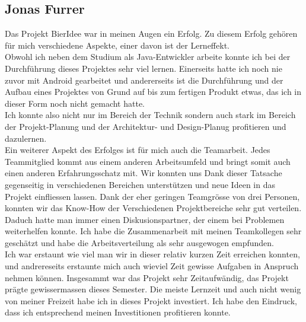 \documentclass[10pt,a4paper]{scrartcl}
\begin{document}
\subsection{Jonas Furrer}
Das Projekt BierIdee war in meinen Augen ein Erfolg. Zu diesem Erfolg gehören für mich verschiedene Aspekte, einer davon 
ist der Lerneffekt.\\
Obwohl ich neben dem Studium als Java-Entwickler arbeite konnte ich bei der Durchführung dieses Projektes sehr viel 
lernen. Einerseits hatte ich noch nie zuvor mit Android gearbeitet und andererseits ist die Durchführung und der Aufbau
eines Projektes von Grund auf bis zum fertigen Produkt etwas, das ich in dieser Form noch nicht gemacht hatte.\\
Ich konnte also nicht nur im Bereich der Technik sondern auch stark im Bereich der Projekt-Planung und der 
Architektur- und Design-Planug profitieren und dazulernen.\\
Ein weiterer Aspekt des Erfolges ist für mich auch die Teamarbeit. Jedes Teammitglied kommt aus einem anderen 
Arbeitsumfeld und bringt somit auch einen anderen Erfahrungsschatz mit. Wir konnten uns Dank dieser Tatsache gegenseitig
in verschiedenen Bereichen unterstützen und neue Ideen in das Projekt einfliessen lassen. Dank der eher geringen
Teamgrösse von drei Personen, konnten wir das Know-How der Verschiedenen Projektbereiche sehr gut verteilen. Daduch
hatte man immer einen Diskusionspartner, der einem bei Problemen weiterhelfen konnte. Ich habe die Zusammenarbeit mit 
meinen Teamkollegen sehr geschätzt und habe die Arbeitsverteilung als sehr ausgewogen empfunden.\\
Ich war erstaunt wie viel man wir in dieser relativ kurzen Zeit erreichen konnten, und andrereseits erstaunte mich auch
wieviel Zeit gewisse Aufgaben in Anspruch nehmen können. Insgesammt war das Projekt sehr Zeitaufwändig, das Projekt
prägte gewissermassen dieses Semester. Die meiste Lernzeit und auch nicht wenig von meiner Freizeit habe ich in dieses
Projekt investiert. Ich habe den Eindruck, dass ich entsprechend meinen Investitionen profitieren konnte.
\end{document}
